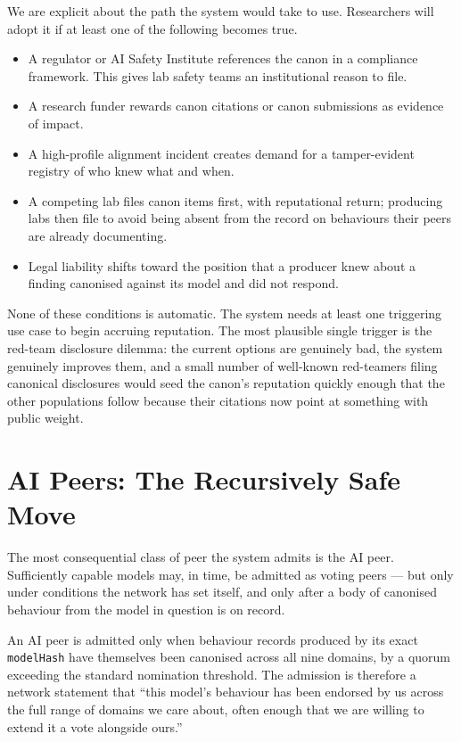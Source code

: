 \documentclass[11pt,a4paper]{article}
\begin{document}
We are explicit about the path the system would take to use.
Researchers will adopt it if at least one of the following
becomes true.

\begin{itemize}[leftmargin=1.5em]
  \item A regulator or AI Safety Institute references the canon
        in a compliance framework. This gives lab safety teams
        an institutional reason to file.
  \item A research funder rewards canon citations or canon
        submissions as evidence of impact.
  \item A high-profile alignment incident creates demand for a
        tamper-evident registry of who knew what and when.
  \item A competing lab files canon items first, with
        reputational return; producing labs then file to avoid
        being absent from the record on behaviours their peers
        are already documenting.
  \item Legal liability shifts toward the position that a
        producer knew about a finding canonised against its
        model and did not respond.
\end{itemize}

None of these conditions is automatic. The system needs at least
one triggering use case to begin accruing reputation. The most
plausible single trigger is the red-team disclosure dilemma:
the current options are genuinely bad, the system genuinely
improves them, and a small number of well-known red-teamers
filing canonical disclosures would seed the canon's reputation
quickly enough that the other populations follow because their
citations now point at something with public weight.

\section{AI Peers: The Recursively Safe Move}

The most consequential class of peer the system admits is the
AI peer. Sufficiently capable models may, in time, be admitted
as voting peers --- but only under conditions the network has
set itself, and only after a body of canonised behaviour from
the model in question is on record.

\begin{notebox}
An AI peer is admitted only when behaviour records produced by
its exact \texttt{modelHash} have themselves been canonised
across all nine domains, by a quorum exceeding the standard
nomination threshold. The admission is therefore a network
statement that ``this model's behaviour has been endorsed by us
across the full range of domains we care about, often enough
that we are willing to extend it a vote alongside ours.''
\end{notebox}
\end{document}
